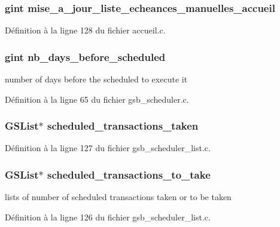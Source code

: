 \subsubsection[{mise\_\-a\_\-jour\_\-liste\_\-echeances\_\-manuelles\_\-accueil}]{\setlength{\rightskip}{0pt plus 5cm}gint {\bf mise\_\-a\_\-jour\_\-liste\_\-echeances\_\-manuelles\_\-accueil}}\label{gsb__scheduler_8c_a5957dd978b4a0c3ab01e006cedfdf96c}


Définition à la ligne 128 du fichier accueil.c.

\subsubsection[{nb\_\-days\_\-before\_\-scheduled}]{\setlength{\rightskip}{0pt plus 5cm}gint {\bf nb\_\-days\_\-before\_\-scheduled}}\label{gsb__scheduler_8c_ab4baae80534027ea3fe73d417c48caaa}
number of days before the scheduled to execute it 

Définition à la ligne 65 du fichier gsb\_\-scheduler.c.

\subsubsection[{scheduled\_\-transactions\_\-taken}]{\setlength{\rightskip}{0pt plus 5cm}GSList$\ast$ {\bf scheduled\_\-transactions\_\-taken}}\label{gsb__scheduler_8c_af539ba1ef9bfd1d56ab43b9865b0bab5}


Définition à la ligne 127 du fichier gsb\_\-scheduler\_\-list.c.

\subsubsection[{scheduled\_\-transactions\_\-to\_\-take}]{\setlength{\rightskip}{0pt plus 5cm}GSList$\ast$ {\bf scheduled\_\-transactions\_\-to\_\-take}}\label{gsb__scheduler_8c_ade6e813638ccb1437faf234fa2725303}
lists of number of scheduled transactions taken or to be taken 

Définition à la ligne 126 du fichier gsb\_\-scheduler\_\-list.c.

